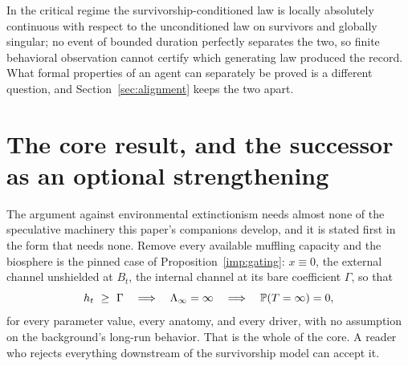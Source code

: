 \begin{theorem}\label{imp:ceiling}
In the critical regime the survivorship-conditioned law is locally
absolutely continuous with respect to the unconditioned law on
survivors and globally singular; no event of bounded duration perfectly
separates the two, so finite behavioral observation cannot certify
which generating law produced the record. What formal properties of an
agent can separately be proved is a different question, and
Section~\ref{sec:alignment} keeps the two apart.
\end{theorem}

\section{The core result, and the successor as an optional strengthening}\label{sec:core}

The argument against environmental extinctionism needs almost none of
the speculative machinery this paper's companions develop, and it is
stated first in the form that needs none. Remove every available
muffling capacity and the biosphere is the pinned case of
Proposition~\ref{imp:gating}: $x\equiv0$, the external channel
unshielded at $B_t$, the internal channel at its bare coefficient
$\Gamma$, so that
\[
h_t\ \ge\ \Gamma\quad\Longrightarrow\quad\Lambda_\infty=\infty
\quad\Longrightarrow\quad\PP(T=\infty)=0,
\]
for every parameter value, every anatomy, and every driver, with no
assumption on the background's long-run behavior. That is the whole of
the core. A reader who rejects everything downstream of the survivorship
model can accept it.

